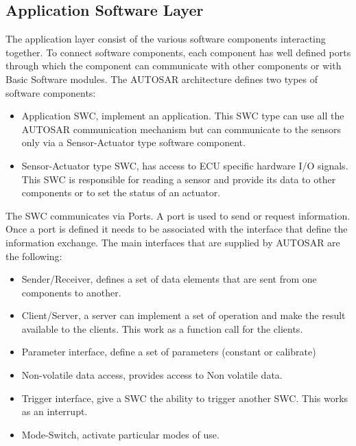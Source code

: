 \documentclass[../main.tex]{subfiles}
\begin{document}
\subsection{Application Software Layer}
The application layer consist of the various software components interacting together. To connect software components, each component has well defined ports through which the component can communicate with other components or with Basic Software modules. The \gls{AUTOSAR} architecture defines two types of software components:
\begin{itemize}
    \item Application \gls{SWC}, implement an application. This \gls{SWC} type can use all the \gls{AUTOSAR} communication mechanism but can communicate to the sensors only via a Sensor-Actuator type software component. 
    \item Sensor-Actuator type \gls{SWC}, has access to \gls{ECU} specific hardware \gls{I/O} signals. This \gls{SWC} is responsible for reading a sensor and provide its data to other components or to set the status of an actuator. 
\end{itemize}
The \gls{SWC} communicates via Ports. A port is used to send or request information. Once a port is defined it needs to be associated with the interface that define the information exchange. The main interfaces that are supplied by \gls{AUTOSAR} are the following:
\begin{itemize}
    \item Sender/Receiver, defines a set of data elements that are sent from one components to another. 
    \item Client/Server, a server can implement a set of operation and make the result available to the clients. This work as a function call for the clients. 
    \item Parameter interface, define a set of parameters (constant or calibrate)
    \item Non-volatile data access, provides access to Non volatile data. 
    \item Trigger interface, give a \gls{SWC} the ability to trigger another \gls{SWC}. This works as an interrupt. 
    \item Mode-Switch, activate particular modes of use. 
\end{itemize}
\end{document}
